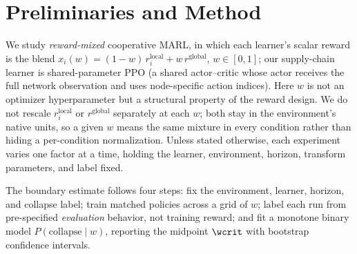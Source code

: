\section{Preliminaries and Method}
\label{sec:method}

We study \emph{reward-mixed} cooperative MARL, in which each learner's scalar reward is the blend
$x_i(w)=(1-w)\,r_i^{\mathrm{local}}+w\,r^{\mathrm{global}}$, $w\in[0,\allowbreak 1]$; our supply-chain
learner is shared-parameter PPO (a shared actor--critic whose actor receives the full network
observation and uses node-specific action indices). Here $w$ is not an
optimizer hyperparameter but a structural property of the reward design. We do not rescale
$r_i^{\mathrm{local}}$ or $r^{\mathrm{global}}$ separately at each $w$; both stay in the
environment's native units, so a given $w$ means the same mixture in every condition rather than
hiding a per-condition normalization. Unless stated otherwise, each experiment varies one factor at
a time, holding the learner, environment, horizon, transform parameters, and label fixed.

The boundary estimate follows four steps: fix the environment, learner, horizon, and collapse
label; train matched policies across a grid of $w$; label each run from pre-specified
\emph{evaluation} behavior, not training reward; and fit a monotone binary model
$P(\mathrm{collapse}\mid w)$, reporting the midpoint $\wcrit$ with bootstrap confidence intervals.



